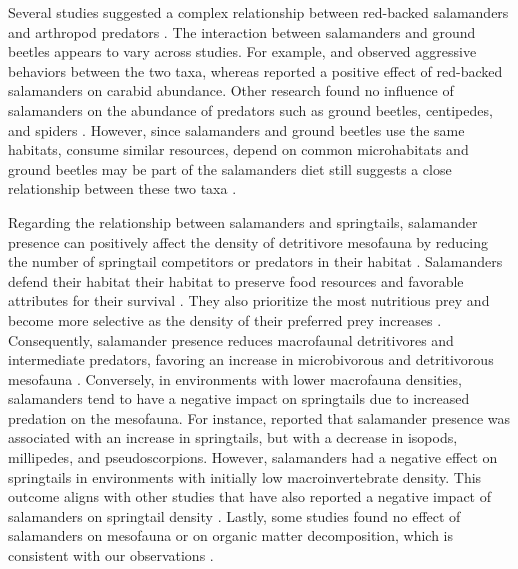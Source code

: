 Several studies suggested a complex relationship between red-backed salamanders and arthropod predators \citep{Gall2003BehavioralInteractions,Walton2006Salamandersforestfloor,Hickerson2018Behavioralinteractions}. 
The interaction between salamanders and ground beetles appears to vary across studies.  
For example, \cite{Gall2003BehavioralInteractions} and \cite{Ovaska1988Predatorybehavior} observed aggressive behaviors between the two taxa, whereas \cite{Hickerson2012Interactionsforestfloor} reported a positive effect of red-backed salamanders on carabid abundance. 
Other research found no influence of salamanders on the abundance of predators such as ground beetles, centipedes, and spiders \citep{Hocking2013Effectsexperimental}. 
However, since salamanders and ground beetles use the same habitats, consume similar resources, depend on common microhabitats and ground beetles may be part of the salamanders diet still suggests a close relationship between these two taxa \citep{Jaeger1980MicrohabitatsTerrestrial,loveiEcologyBehaviorGround1996}.

Regarding the relationship between salamanders and springtails, salamander presence can positively affect the density of detritivore mesofauna by reducing the number of springtail competitors or predators in their habitat \citep{Wyman1998Experimentalassessment,Rooney2000impactsalamander,Walton2005Contrastingeffects,Walton2006Salamandersforestfloor}. 
Salamanders defend their habitat their habitat to preserve food resources and favorable attributes for their survival \citep{Gall2003BehavioralInteractions,Hickerson2004Behavioralinteractions,Hickerson2012Interactionsforestfloor}. 
They also prioritize the most nutritious prey and become more selective as the density of their preferred prey increases \citep{Jaeger1981Foragingtactics,Jaeger1982ForagingTactics}. 
Consequently, salamander presence reduces macrofaunal detritivores and intermediate predators, favoring an increase in microbivorous and detritivorous mesofauna \citep{Rooney2000impactsalamander,Walton2005Contrastingeffects,Walton2006Salamandersforestfloor}. 
Conversely, in environments with lower macrofauna densities, salamanders tend to have a negative impact on springtails due to increased predation on the mesofauna. 
For instance, \cite{Walton2006Salamandersforestfloor} reported that salamander presence was associated with an increase in springtails, but with a decrease in isopods, millipedes, and pseudoscorpions. 
However, salamanders had a negative effect on springtails in environments with initially low macroinvertebrate density. 
This outcome aligns with other studies that have also reported a negative impact of salamanders on springtail density \citep{Hickerson2017Easternredbacked}. 
Lastly, some studies found no effect of salamanders on mesofauna or on organic matter decomposition, which is consistent with our observations \citep{Hocking2013Effectsexperimental,Hocking2014Effectsredbacked}.

